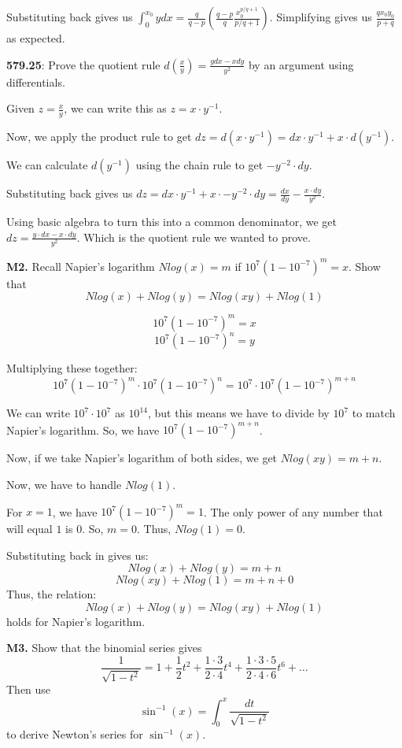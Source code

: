 \documentclass{article}
\begin{document}
Substituting back gives us $\int_{0}^{x_0} y dx = \frac{q}{q-p} \left(\frac{q-p}{q} \frac{x_0^{p/q + 1}}{p/q + 1}\right)$.
Simplifying gives us $\frac{q x_0 y_0}{p + q}$ as expected.


\textbf{579.25}: Prove the quotient rule $d(\frac{x}{y}) = \frac{y dx - x dy}{y^2}$
by an argument using differentials.

Given $z = \frac{x}{y}$, we can write this as $z = x \cdot y^{-1}$.

Now, we apply the product rule to get $dz = d(x \cdot y^{-1}) = dx \cdot y^{-1} + x \cdot d(y^{-1})$.

We can calculate $d(y^{-1})$ using the chain rule to get $- y^{-2} \cdot dy$.

Substituting back gives us $dz = dx \cdot y^{-1} + x \cdot - y^{-2} \cdot dy = \frac{dx}{dy} - \frac{x \cdot dy}{y^2}$.

Using basic algebra to turn this into a common denominator, we get
$dz = \frac{y \cdot dx - x \cdot dy}{y^2}$. Which is the quotient rule we
wanted to prove.


\textbf{M2.} Recall Napier's logarithm $Nlog(x) = m$ if
$10^7 (1 - 10^{-7})^m = x$. Show that
\[Nlog(x) + Nlog(y) = Nlog(xy) + Nlog(1)\]

\[10^7(1 - 10^{-7})^m = x\]
\[10^7(1 - 10^{-7})^n = y\]

Multiplying these together:
\[10^7(1 - 10^{-7})^m \cdot 10^7(1 - 10^{-7})^n = 10^7 \cdot 10^7(1 - 10^{-7})^{m+n}\]

We can write $10^7 \cdot 10^7$ as $10^14$, but this means we have to divide by $10^7$
to match Napier's logarithm. So, we have $10^7(1 - 10^{-7})^{m+n}$.

Now, if we take Napier's logarithm of both sides, we get $Nlog(xy) = m + n$.

Now, we have to handle $Nlog(1)$.

For $x=1$, we have $10^7(1-10^{-7})^m = 1$.
The only power of any number that will equal $1$ is $0$.
So, $m = 0$.
Thus, $Nlog(1) = 0$.

Substituting back in gives us:
\[Nlog(x) + Nlog(y) = m + n\]
\[Nlog(xy) + Nlog(1) = m + n + 0\]
Thus, the relation:
\[Nlog(x) + Nlog(y) = Nlog(xy) + Nlog(1)\]
holds for Napier's logarithm.


\textbf{M3.} Show that the binomial series gives
\[\frac{1}{\sqrt{1-t^2}} = 1 + \frac{1}{2} t^2 + \frac{1 \cdot 3}{2 \cdot 4} t^4 + \frac{1 \cdot 3 \cdot 5}{2 \cdot 4 \cdot 6} t^6 + \dots\]
Then use
\[\sin^{-1}(x) = \int_{0}^{x} \frac{dt}{\sqrt{1 - t^2}}\]
to derive Newton's series for $\sin^{-1}(x)$.
\end{document}
